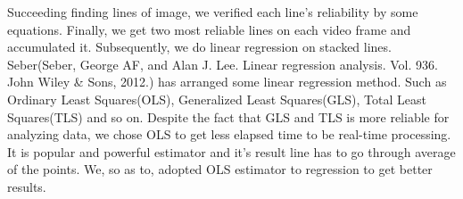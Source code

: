 {Succeeding finding lines of image, we verified each line's reliability by some equations. \newline
Finally, we get two most reliable lines on each video frame and accumulated it. Subsequently, we do linear regression on stacked lines. Seber(Seber, George AF, and Alan J. Lee. Linear regression analysis. Vol. 936. John Wiley \& Sons, 2012.) has arranged some linear regression method. Such as Ordinary Least Squares(OLS), Generalized Least Squares(GLS), Total Least Squares(TLS) and so on. Despite the fact that GLS and TLS is more reliable for analyzing data, we chose OLS to get less elapsed time to be real-time processing. It is popular and powerful estimator and it's result line has to go through average of the points. We, so as to, adopted OLS estimator to regression to get better results.}